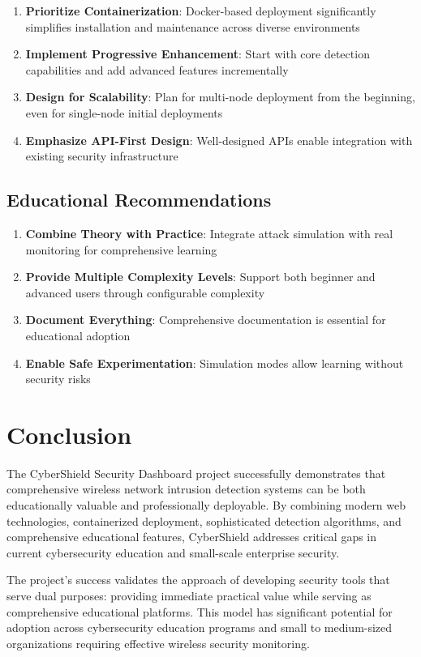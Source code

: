 \documentclass[12pt,a4paper]{report}
\begin{document}
\begin{enumerate}
    \item \textbf{Prioritize Containerization}: Docker-based deployment significantly simplifies installation and maintenance across diverse environments
    \item \textbf{Implement Progressive Enhancement}: Start with core detection capabilities and add advanced features incrementally
    \item \textbf{Design for Scalability}: Plan for multi-node deployment from the beginning, even for single-node initial deployments
    \item \textbf{Emphasize API-First Design}: Well-designed APIs enable integration with existing security infrastructure
\end{enumerate}

\subsection{Educational Recommendations}

\begin{enumerate}
    \item \textbf{Combine Theory with Practice}: Integrate attack simulation with real monitoring for comprehensive learning
    \item \textbf{Provide Multiple Complexity Levels}: Support both beginner and advanced users through configurable complexity
    \item \textbf{Document Everything}: Comprehensive documentation is essential for educational adoption
    \item \textbf{Enable Safe Experimentation}: Simulation modes allow learning without security risks
\end{enumerate}

\section{Conclusion}

The CyberShield Security Dashboard project successfully demonstrates that comprehensive wireless network intrusion detection systems can be both educationally valuable and professionally deployable. By combining modern web technologies, containerized deployment, sophisticated detection algorithms, and comprehensive educational features, CyberShield addresses critical gaps in current cybersecurity education and small-scale enterprise security.

The project's success validates the approach of developing security tools that serve dual purposes: providing immediate practical value while serving as comprehensive educational platforms. This model has significant potential for adoption across cybersecurity education programs and small to medium-sized organizations requiring effective wireless security monitoring.
\end{document}
